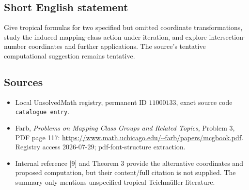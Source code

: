 \documentclass[11pt]{article}
\begin{document}
\subsection{Short English statement}
Give tropical formulas for two specified but omitted coordinate transformations, study the induced mapping-class action under iteration, and explore intersection-number coordinates and further applications. The source's tentative computational suggestion remains tentative.
\subsection{Sources}
\begin{itemize}
\item Local UnsolvedMath registry, permanent ID \(11000133\), exact source code \texttt{catalogue entry}.
\item Farb, \emph{Problems on Mapping Class Groups and Related Topics}, Problem 3, PDF page 117: \url{https://www.math.uchicago.edu/~farb/papers/mcgbook.pdf}. Registry access 2026-07-29; pdf-font-structure extraction.
\item Internal reference [9] and Theorem 3 provide the alternative coordinates and proposed computation, but their content/full citation is not supplied. The summary only mentions unspecified tropical Teichm\"uller literature.
\end{itemize}
\end{document}
